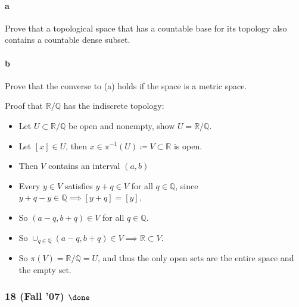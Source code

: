 \hypertarget{a-1}{%
\paragraph{a}\label{a-1}}

Prove that a topological space that has a countable base for its
topology also contains a countable dense subset.

\hypertarget{b-1}{%
\paragraph{b}\label{b-1}}

Prove that the converse to (a) holds if the space is a metric space.

\begin{solution}

\hfill

\begin{concept}

\hfill

\end{concept}

Proof that \({\mathbb{R}}/{\mathbb{Q}}\) has the indiscrete topology:

\begin{itemize}
\tightlist
\item
  Let \(U \subset {\mathbb{R}}/{\mathbb{Q}}\) be open and nonempty, show
  \(U = {\mathbb{R}}/{\mathbb{Q}}\).
\item
  Let \([x] \in U\), then
  \(x \in \pi^{-1}(U) \coloneqq V \subset{\mathbb{R}}\) is open.
\item
  Then \(V\) contains an interval \((a, b)\)
\item
  Every \(y\in V\) satisfies \(y+q \in V\) for all
  \(q\in {\mathbb{Q}}\), since
  \(y+q-y \in {\mathbb{Q}}\implies [y+q] = [y]\).
\item
  So \((a-q, b+q) \in V\) for all \(q\in {\mathbb{Q}}\).
\item
  So
  \(\cup_{q\in {\mathbb{Q}}}(a-q, b+q) \in V \implies {\mathbb{R}}\subset V\).
\item
  So \(\pi(V) = {\mathbb{R}}/{\mathbb{Q}}= U\), and thus the only open
  sets are the entire space and the empty set.
\end{itemize}

\end{solution}

\hypertarget{fall-07-done-1}{%
\subsubsection{\texorpdfstring{18 (Fall '07)
\(\done\)}{18 (Fall '07) \textbackslash done}}\label{fall-07-done-1}}

